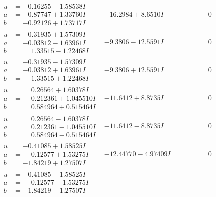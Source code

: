 \documentclass[1p]{elsarticle_modified}
\theoremstyle{definition}
\begin{document}
$$\begin{array}{c|c|c}
 \hline 
\begin{aligned}
u &= -0.16255 - 1.58538 I \\
a &= -0.87747 + 1.33760 I \\
b &= -0.92126 + 1.73717 I\end{aligned}
 & -16.2984 + 8.6510 I & \phantom{-0.000000 } 0 \\ \hline\begin{aligned}
u &= -0.31935 + 1.57309 I \\
a &= -0.03812 - 1.63961 I \\
b &= \phantom{-}1.33515 - 1.22468 I\end{aligned}
 & -9.3806 - 12.5591 I & \phantom{-0.000000 } 0 \\ \hline\begin{aligned}
u &= -0.31935 - 1.57309 I \\
a &= -0.03812 + 1.63961 I \\
b &= \phantom{-}1.33515 + 1.22468 I\end{aligned}
 & -9.3806 + 12.5591 I & \phantom{-0.000000 } 0 \\ \hline\begin{aligned}
u &= \phantom{-}0.26564 + 1.60378 I \\
a &= \phantom{-}0.212361 + 1.045510 I \\
b &= \phantom{-}0.584964 + 0.515464 I\end{aligned}
 & -11.6412 + 8.8735 I & \phantom{-0.000000 } 0 \\ \hline\begin{aligned}
u &= \phantom{-}0.26564 - 1.60378 I \\
a &= \phantom{-}0.212361 - 1.045510 I \\
b &= \phantom{-}0.584964 - 0.515464 I\end{aligned}
 & -11.6412 - 8.8735 I & \phantom{-0.000000 } 0 \\ \hline\begin{aligned}
u &= -0.41085 + 1.58525 I \\
a &= \phantom{-}0.12577 + 1.53275 I \\
b &= -1.84219 + 1.27507 I\end{aligned}
 & -12.44770 - 4.97409 I & \phantom{-0.000000 } 0 \\ \hline\begin{aligned}
u &= -0.41085 - 1.58525 I \\
a &= \phantom{-}0.12577 - 1.53275 I \\
b &= -1.84219 - 1.27507 I\end{aligned}

\end{array}$$
\end{document}
